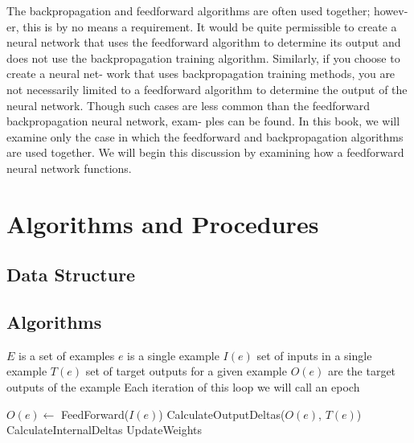 \documentclass[11pt]{article}
\begin{document}
The backpropagation and feedforward algorithms are often used together; howev- er, this is by no means a requirement. It would be quite
permissible to create a neural network that uses the feedforward algorithm to determine its output and does not use the backpropagation
training algorithm. Similarly, if you choose to create a neural net- work that uses backpropagation training methods, you are not
necessarily limited to a feedforward algorithm to determine the output of the neural network. Though such cases are less common than
the feedforward backpropagation neural network, exam- ples can be found. In this book, we will examine only the case in which the
feedforward and backpropagation algorithms are used together. We will begin this discussion by examining how a feedforward neural
network functions.




\section{Algorithms and Procedures} %
\label{sec:algorithms_and_procedures}

\subsection{Data Structure} %
\label{sub:data_structure}


\subsection{Algorithms} %
\label{sub:algorithms}

$E$ is a set of examples
$e$ is a single example
$I(e)$ set of inputs in a single example
$T(e)$ set of target outputs for a given example
$O(e)$ are the target outputs of the example
Each iteration of this loop we will call an epoch

\begin{algorithmic}
		\STATE $O(e) \gets$ FeedForward($I(e)$)
		\STATE CalculateOutputDeltas($O(e)$, $T(e)$)
		\STATE CalculateInternalDeltas
		\STATE UpdateWeights
	\ENDFOR
\end{algorithmic}
\end{document}
